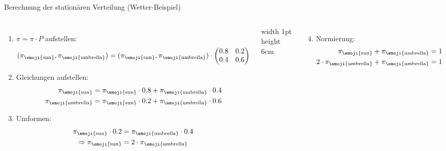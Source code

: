 \begin{frame}{Berechnung der stationären Verteilung (Wetter-Beispiel)}
    \begin{columns}
        \begin{enumerate}[<+->]
            \item $\pi = \pi \cdot P$ aufstellen: \[(\pi_{\text{\emoji{sun}}}, \pi_{\text{\emoji{umbrella}}}) = (\pi_{\text{\emoji{sun}}}, \pi_{\text{\emoji{umbrella}}}) \cdot \begin{pmatrix} 0.8 & 0.2 \\ 0.4 & 0.6 \end{pmatrix}\]
            \item Gleichungen aufstellen:
                  \[
                      \begin{aligned}
                          \pi_{\text{\emoji{sun}}}      & = \pi_{\text{\emoji{sun}}} \cdot 0.8 + \pi_{\text{\emoji{umbrella}}} \cdot 0.4 \\
                          \pi_{\text{\emoji{umbrella}}} & = \pi_{\text{\emoji{sun}}} \cdot 0.2 + \pi_{\text{\emoji{umbrella}}} \cdot 0.6
                      \end{aligned}
                  \]
            \item Umformen:
                  \[
                      \begin{aligned}
                          \pi_{\text{\emoji{sun}}} \cdot 0.2   & = \pi_{\text{\emoji{umbrella}}} \cdot 0.4 \\
                          \Rightarrow \pi_{\text{\emoji{sun}}} & = 2 \cdot \pi_{\text{\emoji{umbrella}}}
                      \end{aligned}
                  \]
        \end{enumerate}
        \begin{center}
            \vrule width 1pt height 6cm
        \end{center}
        \begin{enumerate}[<+->]
            \setcounter{enumi}{3}
            \item Normierung:
                  \[
                      \begin{aligned}
                          \pi_{\text{\emoji{sun}}} + \pi_{\text{\emoji{umbrella}}}              & = 1           \\
                          2 \cdot \pi_{\text{\emoji{umbrella}}} + \pi_{\text{\emoji{umbrella}}} & = 1           \\

\end{aligned}\]
\end{enumerate}
\end{columns}
\end{frame}
